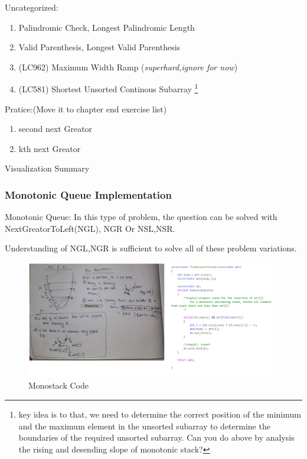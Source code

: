 \begin{exercise}
    Uncategorized:
    \begin{enumerate}
        \item Palindromic Check, Longest Palindromic Length
        \item Valid Parenthesis, Longest Valid Parenthesis
        \item (LC962) Maximum Width Ramp (\textit{superhard,ignore for now})
        
        \item (LC581) Shortest Unsorted Continous Subarray \footnote{key idea is to that, we need to determine the correct position of the minimum and the maximum element in the unsorted subarray to determine the boundaries of the required unsorted subarray.
        Can you do above by analysis the rising and desending slope of monotonic stack?
        }
    \end{enumerate}

    Pratice:(Move it to chapter end exercise list)
    \begin{enumerate}
        \item second next Greator
        \item kth next Greator
    \end{enumerate}
\end{exercise}

\hrulefill Visualization Summary \hrulefill

\subsubsection{Monotonic Queue Implementation}

Monotonic Queue:    
In this type of problem, the question can be solved with NextGreatorToLeft(NGL), NGR Or NSL,NSR.

Understanding of NGL,NGR is sufficient to solve all of these problem variations.

\clearpage
\begin{fullwidth}
\begin{figure}[h]
    
    \caption{Monostack Code}
    \includegraphics[width=\dimexpr\textwidth+\marginparwidth\relax]{resources/monotonic-decreasing-stack-2.jpg}
    \end{figure}

\end{fullwidth}

